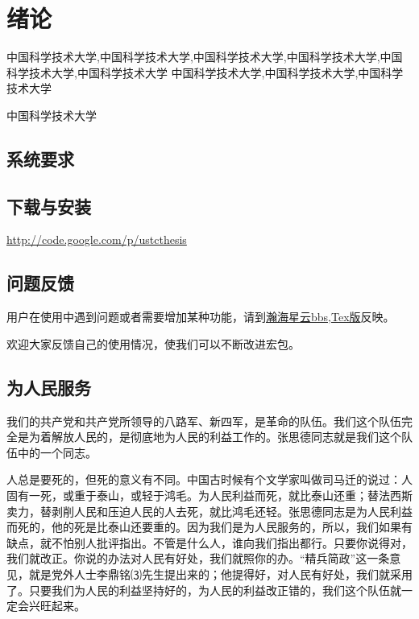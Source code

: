 ﻿
\chapter{绪论}
\label{chap:introduction}

中国科学技术大学,中国科学技术大学,中国科学技术大学,中国科学技术大学,中国科学技术大学,中国科学技术大学
中国科学技术大学,中国科学技术大学,中国科学技术大学


中国科学技术大学

\section{系统要求}



\section{下载与安装}


\href{http://code.google.com/p/ustcthesis}{http://code.google.com/p/ustcthesis}




\section{问题反馈}

用户在使用中遇到问题或者需要增加某种功能，请到\href{http://bbs.ustc.edu.cn/cgi/go?cgi=bbsdoc&board=TeX}{瀚海星云bbs,Tex版}反映。


欢迎大家反馈自己的使用情况，使我们可以不断改进宏包。

\section{为人民服务}


我们的共产党和共产党所领导的八路军、新四军，是革命的队伍。我们这个队伍完全是为着解放人民的，是彻底地为人民的利益工作的。张思德同志就是我们这个队伍中的一个同志。

人总是要死的，但死的意义有不同。中国古时候有个文学家叫做司马迁的说过：人固有一死，或重于泰山，或轻于鸿毛。为人民利益而死，就比泰山还重；替法西斯卖力，替剥削人民和压迫人民的人去死，就比鸿毛还轻。张思德同志是为人民利益而死的，他的死是比泰山还要重的。因为我们是为人民服务的，所以，我们如果有缺点，就不怕别人批评指出。不管是什么人，谁向我们指出都行。只要你说得对，我们就改正。你说的办法对人民有好处，我们就照你的办。“精兵简政”这一条意见，就是党外人士李鼎铭⑶先生提出来的；他提得好，对人民有好处，我们就采用了。只要我们为人民的利益坚持好的，为人民的利益改正错的，我们这个队伍就一定会兴旺起来。

